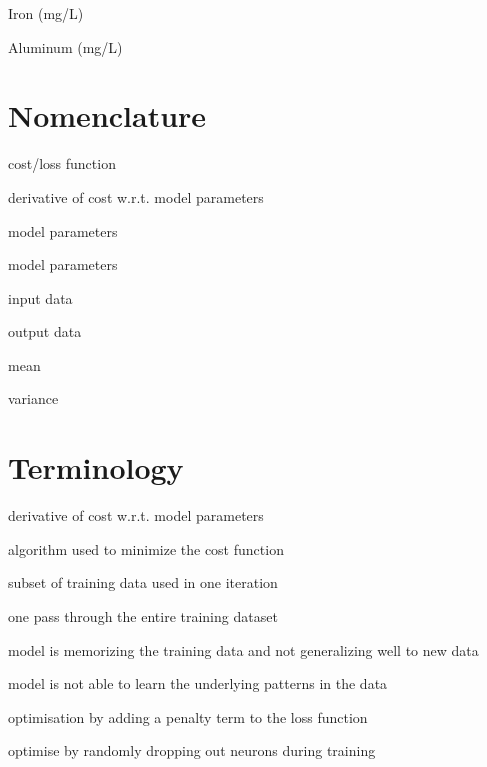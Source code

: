\documentclass[
  a4paper,
  twoside]{uoe-thesis-template}
\providecommand{\tightlist}{%
  \setlength{\itemsep}{0pt}\setlength{\parskip}{0pt}}\usepackage{longtable,booktabs,array}
\begin{document}

\begin{description}
\tightlist
\item[\(\text{Fe}\)]
Iron (mg/L)
\item[\(\text{Al}\)]
Aluminum (mg/L)
\end{description}

\section*{Nomenclature}\label{nomenclature}


\begin{description}
\tightlist
\item[\(J\)]
cost/loss function
\item[\(\nabla\)]
derivative of cost w.r.t. model parameters
\item[\(w\)]
model parameters
\item[\(b\)]
model parameters
\item[\(x\)]
input data
\item[\(y\)]
output data
\item[\(\mu\)]
mean
\item[\(\sigma^2\)]
variance
\end{description}

\section*{Terminology}\label{terminology}


\begin{description}
\tightlist
\item[gradient]
derivative of cost w.r.t. model parameters
\item[optimizer]
algorithm used to minimize the cost function
\item[batch]
subset of training data used in one iteration
\item[epoch]
one pass through the entire training dataset
\item[overfitting]
model is memorizing the training data and not generalizing well to new
data
\item[underfitting]
model is not able to learn the underlying patterns in the data
\item[regularization]
optimisation by adding a penalty term to the loss function
\item[dropout]
optimise by randomly dropping out neurons during training
\end{description}
\end{document}
